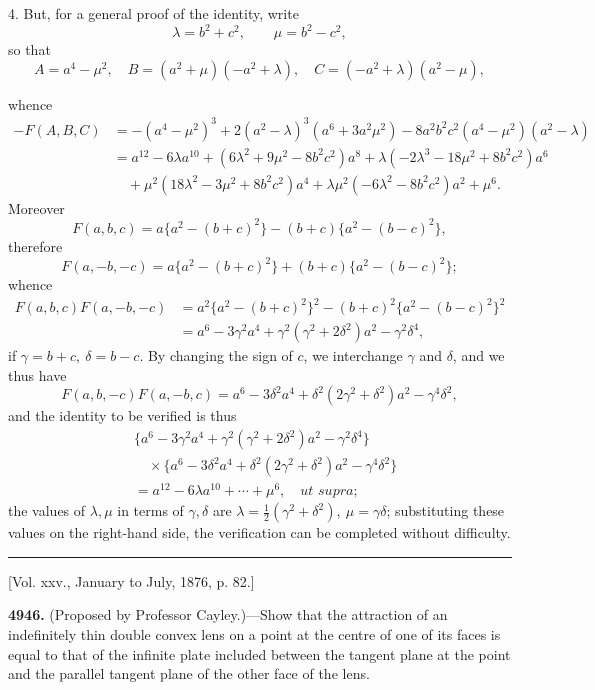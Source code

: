 \documentclass[10pt,twoside]{article}
\begin{document}
4. But, for a general proof of the identity, write
\[
        \lambda=b^2+c^2,\qquad \mu=b^2-c^2,
\]
so that
\[
        A=a^4-\mu^2,\quad B=(a^2+\mu)(-a^2+\lambda),\quad
        C=(-a^2+\lambda)(a^2-\mu),
\]

\newpage

whence
\[
\begin{aligned}
-F(A,B,C)
&=-(a^4-\mu^2)^3+2(a^2-\lambda)^3(a^6+3a^2\mu^2)
  -8a^2b^2c^2(a^4-\mu^2)(a^2-\lambda)\\
&=a^{12}-6\lambda a^{10}+(6\lambda^2+9\mu^2-8b^2c^2)a^8
 +\lambda(-2\lambda^3-18\mu^2+8b^2c^2)a^6\\
&\quad+\mu^2(18\lambda^2-3\mu^2+8b^2c^2)a^4
 +\lambda\mu^2(-6\lambda^2-8b^2c^2)a^2+\mu^6.
\end{aligned}
\]
Moreover
\[
F(a,b,c)=a\{a^2-(b+c)^2\}-(b+c)\{a^2-(b-c)^2\},
\]
therefore
\[
F(a,-b,-c)=a\{a^2-(b+c)^2\}+(b+c)\{a^2-(b-c)^2\};
\]
whence
\[
\begin{aligned}
F(a,b,c)F(a,-b,-c)
&=a^2\{a^2-(b+c)^2\}^2-(b+c)^2\{a^2-(b-c)^2\}^2\\
&=a^6-3\gamma^2a^4+\gamma^2(\gamma^2+2\delta^2)a^2-\gamma^2\delta^4,
\end{aligned}
\]
if \(\gamma=b+c,\ \delta=b-c\). By changing the sign of \(c\), we interchange
\(\gamma\) and \(\delta\), and we thus have
\[
F(a,b,-c)F(a,-b,c)=a^6-3\delta^2a^4+\delta^2(2\gamma^2+\delta^2)a^2
-\gamma^4\delta^2,
\]
and the identity to be verified is thus
\[
\begin{aligned}
&\{a^6-3\gamma^2a^4+\gamma^2(\gamma^2+2\delta^2)a^2-\gamma^2\delta^4\}\\
&\quad{}\times
\{a^6-3\delta^2a^4+\delta^2(2\gamma^2+\delta^2)a^2-\gamma^4\delta^2\}\\
&=a^{12}-6\lambda a^{10}+\cdots+\mu^6,\quad \textit{ut supra};
\end{aligned}
\]
the values of \(\lambda,\mu\) in terms of \(\gamma,\delta\) are
\(\lambda=\frac12(\gamma^2+\delta^2),\ \mu=\gamma\delta\); substituting these
values on the right-hand side, the verification can be completed without
difficulty.

\begin{center}
\rule{0.32\linewidth}{0.4pt}

[Vol. xxv., January to July, 1876, p. 82.]
\end{center}

\noindent\textbf{4946.} (Proposed by Professor Cayley.)---Show that the
attraction of an indefinitely thin double convex lens on a point at the centre
of one of its faces is equal to that of the infinite plate included between the
tangent plane at the point and the parallel tangent plane of the other face of
the lens.
\end{document}
